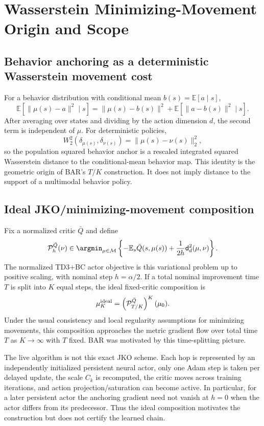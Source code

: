 \documentclass[twoside]{article}
\newcommand{\E}{\mathbb E}
\begin{document}
\onecolumn
{}
\appendix

\section{Wasserstein Minimizing-Movement Origin and Scope}
\subsection{Behavior anchoring as a deterministic Wasserstein movement cost}
For a behavior distribution with conditional mean $b(s)=\E[a\mid s]$,
\[
\E[\|\mu(s)-a\|^2\mid s]=\|\mu(s)-b(s)\|^2+\E[\|a-b(s)\|^2\mid s].
\]
After averaging over states and dividing by the action dimension $d$, the second term is independent of $\mu$. For deterministic policies,
\[
W_2^2(\delta_{\mu(s)},\delta_{\nu(s)})=\|\mu(s)-\nu(s)\|_2^2,
\]
so the population squared behavior anchor is a rescaled integrated squared Wasserstein distance to the conditional-mean behavior map. This identity is the geometric origin of BAR's $T/K$ construction. It does not imply distance to the support of a multimodal behavior policy.

\subsection{Ideal JKO/minimizing-movement composition}
Fix a normalized critic $\bar Q$ and define
\[
\mathcal P_h^{\bar Q}(\nu)\in\argmin_{\mu\in\mathcal M}
\left\{-\E_s\bar Q(s,\mu(s))+\frac{1}{2h}\mathsf d_d^2(\mu,\nu)\right\}.
\]
The normalized TD3+BC actor objective is this variational problem up to positive scaling, with nominal step $h=\alpha/2$. If a total nominal improvement time $T$ is split into $K$ equal steps, the ideal fixed-critic composition is
\[
\mu_K^{\rm ideal}=\left(\mathcal P_{T/K}^{\bar Q}\right)^K(\mu_0).
\]
Under the usual consistency and local regularity assumptions for minimizing movements, this composition approaches the metric gradient flow over total time $T$ as $K\to\infty$ with $T$ fixed. BAR was motivated by this time-splitting picture.

The live algorithm is not this exact JKO scheme. Each hop is represented by an independently initialized persistent neural actor, only one Adam step is taken per delayed update, the scale $C_k$ is recomputed, the critic moves across training iterations, and action projection/saturation can become active. In particular, for a later persistent actor the anchoring gradient need not vanish at $h=0$ when the actor differs from its predecessor. Thus the ideal composition motivates the construction but does not certify the learned chain.
\end{document}
